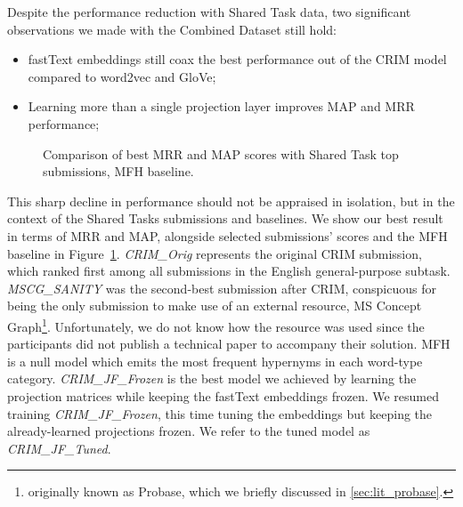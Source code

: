 Despite the performance reduction with Shared Task data, two significant observations we made with the Combined Dataset still hold:
\begin{itemize}
    \item fastText embeddings still coax the best performance out of the CRIM model compared to word2vec and GloVe;
    \item Learning more than a single projection layer improves \ac{MAP} and \ac{MRR} performance;
\end{itemize}
\begin{figure}[!ht]
    \centering
    \qquad
    \caption{Comparison of best \ac{MRR} and \ac{MAP} scores with Shared Task top submissions, MFH baseline.}        
    \label{fig:jf_official_results}
\end{figure}
This sharp decline in performance should not be appraised in isolation, but in the context of the Shared Tasks submissions and baselines.  We show our best result in terms of \ac{MRR} and \ac{MAP}, alongside selected submissions' scores and the \ac{MFH} baseline in Figure~\ref{fig:jf_official_results}.  \textit{CRIM\_Orig} represents the original CRIM submission, which ranked first among all submissions in the English general-purpose subtask.  \textit{MSCG\_SANITY} was the second-best submission after CRIM, conspicuous for being the only submission to make use of an external resource, MS Concept Graph\footnote{originally known as Probase, which we briefly discussed in \cref{sec:lit_probase}.}.  Unfortunately, we do not know how the resource was used since the participants did not publish a technical paper to accompany their solution.  \ac{MFH} is a null model which emits the most frequent hypernyms in each word-type category.  \textit{CRIM\_JF\_Frozen} is the best model we achieved by learning the projection matrices while keeping the fastText embeddings frozen.  We resumed training \textit{CRIM\_JF\_Frozen}, this time tuning the embeddings but keeping the already-learned projections frozen.  We refer to the tuned model as \textit{CRIM\_JF\_Tuned}. 

